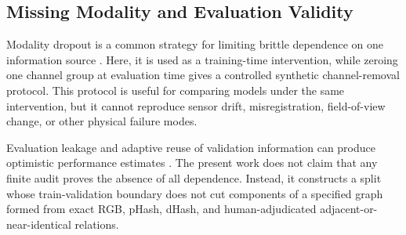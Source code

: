 \subsection{Missing Modality and Evaluation Validity}
Modality dropout is a common strategy for limiting brittle dependence on one information source \cite{neverova2016moddrop}. Here, it is used as a training-time intervention, while zeroing one channel group at evaluation time gives a controlled synthetic channel-removal protocol. This protocol is useful for comparing models under the same intervention, but it cannot reproduce sensor drift, misregistration, field-of-view change, or other physical failure modes.

Evaluation leakage and adaptive reuse of validation information can produce optimistic performance estimates \cite{kapoor2023leakage,cawley2010overfitting}. The present work does not claim that any finite audit proves the absence of all dependence. Instead, it constructs a split whose train-validation boundary does not cut components of a specified graph formed from exact RGB, pHash, dHash, and human-adjudicated adjacent-or-near-identical relations.
